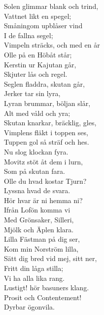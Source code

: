 \documentclass[a6paper,10pt]{article}
\begin{document}
\setlength{\oddsidemargin}{-0.37in}
\noindent
\begin{center}
\end{center}
\begin{lyrics}
\vspace{-5pt}
Solen glimmar blank och trind,\\
Vattnet likt en spegel;\\
Småningom upblåser vind\\
I de fallna segel;\\
Vimpeln sträcks, och med en år\\
Olle på en Höbåt står;\\
Kerstin ur Kajutan går,\\
Skjuter lås och regel.
\vspace{5pt}\\
Seglen fladdra, skutan går,\\
Jerker tar sin lyra,\\
Lyran brummar, böljan slår,\\
Alt med våld och yra;\\
Skutan knarkar, bräcklig, gles,\\
Vimplens fläkt i toppen ses,\\
Tuppen gol så sträf och hes.\\
Nu slog klockan fyra.
\vspace{5pt}\\
Movitz stöt åt dem i lurn,\\
Som på skutan fara.\\
Olle du hvad kostar Tjurn?\\
Lyssna hvad de svara.\\
Hör hvar är ni hemma ni?\\
Ifrån Lofön komma vi\\
Med Grönsaker, Silleri,\\
Mjölk och Äplen klara.
\vspace{5pt}\\
Lilla Fästman på dig ser,\\
Kom min Norström lilla,\\
Sätt dig bred vid mej, sitt ner,\\
Fritt din låga stilla;\\
Vi ha alla lika rang.\\
Lustigt! hör basuners klang.\\
Prosit och Contentement!\\
Dyrbar ögonvila.


\end{lyrics}
\end{document}
